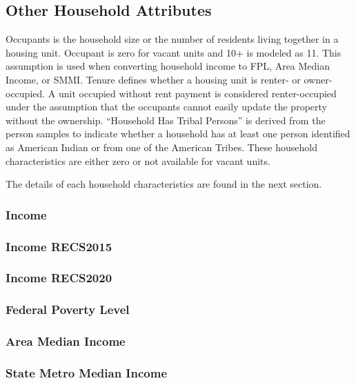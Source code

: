 \subsection{Other Household Attributes}
Occupants is the household size or the number of residents living together in a housing unit. Occupant is zero for vacant units and 10+ is modeled as 11. This assumption is used when converting household income to FPL, Area Median Income, or SMMI. Tenure defines whether a housing unit is renter- or owner-occupied. A unit occupied without rent payment is considered renter-occupied under the assumption that the occupants cannot easily update the property without the ownership. ``Household Has Tribal Persons'' is derived from the person samples to indicate whether a household has at least one person identified as American Indian or from one of the American Tribes. These household characteristics are either zero or not available for vacant units.

The details of each household characteristics are found in the next section.

\subsubsection{Income}\label{income}


\subsubsection{Income RECS2015}\label{income_recs2015}


\subsubsection{Income RECS2020}\label{income_recs2020}


\subsubsection{Federal Poverty Level}\label{federal_poverty_level}


\subsubsection{Area Median Income}\label{area_median_income}


\subsubsection{State Metro Median Income}\label{state_metro_median_income}


